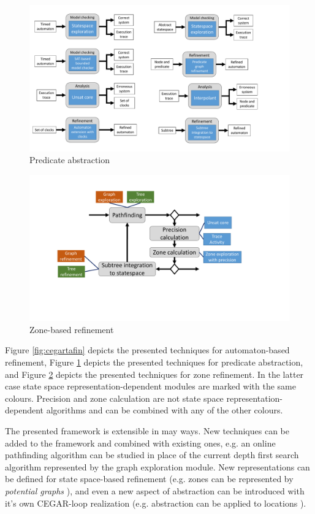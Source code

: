 \begin{runningExample}
\begin{figure}
	\centering
	\includegraphics[width=.9\textwidth]{include/figures/pred_modules}
	\caption{Predicate abstraction}
	\label{fig:cegarpredmodules}
\end{figure}

\begin{figure}
	\centering
	\includegraphics[width=.9\textwidth]{include/figures/cegar_ssp_complete}
	\caption{Zone-based refinement}
	\label{fig:cegarsspfin}
\end{figure}

Figure \ref{fig:cegartafin} depicts the presented techniques for automaton-based refinement, Figure \ref{fig:cegarpredmodules} depicts the presented techniques for predicate abstraction, and Figure \ref{fig:cegarsspfin} depicts the presented techniques for zone refinement. In the latter case state space representation-dependent modules are marked with the same colours. Precision and zone calculation are not state space representation-dependent algorithms and can be combined with any of the other colours.

The presented framework is extensible in may ways. New techniques can be added to the framework and combined with existing ones, e.g. an online pathfinding algorithm can be studied in place of the current depth first search algorithm represented by the graph exploration module. New representations can be defined for state space-based refinement (e.g. zones can be represented by \emph{potential graphs} \cite{conf/sas/GangeNSSS16}), and even a new aspect of abstraction can be introduced with it's own CEGAR-loop realization (e.g. abstraction can be applied to locations \cite{kemper2007sat}).


\end{runningExample}
